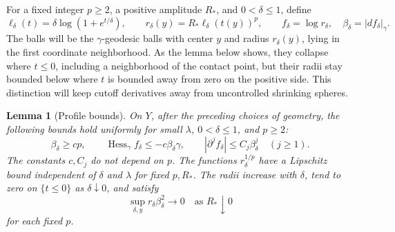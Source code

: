 \documentclass[11pt]{article}
\newtheorem{lemma}[theorem]{Lemma}
\theoremstyle{definition}
\theoremstyle{remark}
\numberwithin{equation}{section}
\begin{document}
For a fixed integer $p\geq2$, a positive amplitude $R_*$, and
$0<\delta\leq1$, define
\begin{equation}\label{balls:radius}
 \ell_\delta(t)=\delta\log(1+e^{t/\delta}),\qquad
 r_\delta(y)=R_*\ell_\delta(t(y))^p,
 \qquad f_\delta=\log r_\delta,\quad
 \beta_\delta=|df_\delta|_\gamma.
\end{equation}
The balls will be the $\gamma$-geodesic balls with center $y$ and radius
$r_\delta(y)$, lying in the first coordinate neighborhood. As the lemma
below shows, they collapse where $t\le0$, including a neighborhood of
the contact point, but their radii stay bounded below where $t$ is
bounded away from zero on the positive side. This distinction will keep
cutoff derivatives away from uncontrolled shrinking spheres.

\begin{lemma}[Profile bounds]\label{balls:profiles}
On $Y$, after the preceding choices of geometry, the following bounds
hold uniformly for small $\lambda$, $0<\delta\leq1$, and $p\geq2$:
\begin{equation}\label{balls:profile-estimates}
 \beta_\delta\geq c p,\qquad
 \operatorname{Hess}_\gamma f_\delta\leq-c\beta_\delta\gamma,
 \qquad |\partial^j f_\delta|\leq C_j\beta_\delta^j
 \quad(j\geq1).
\end{equation}
The constants $c,C_j$ do not depend on $p$.  The functions
$r_\delta^{1/p}$ have a Lipschitz bound independent of $\delta$ and
$\lambda$ for fixed $p,R_*$.  The radii increase with $\delta$, tend to
zero on $\{t\leq0\}$ as $\delta\downarrow0$, and satisfy
\begin{equation}\label{balls:radius-smallness}
 \sup_{\delta,y}r_\delta\beta_\delta^2\longrightarrow0
 \quad\text{as }R_*\downarrow0
\end{equation}
for each fixed $p$.
\end{lemma}
\end{document}
